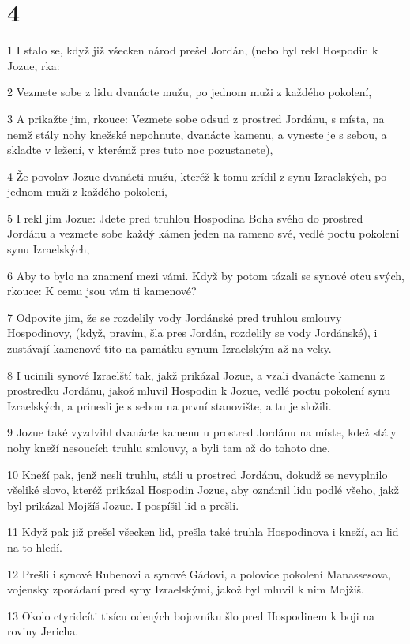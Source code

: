 \chapter{4}

\par 1 I stalo se, když již všecken národ prešel Jordán, (nebo byl rekl Hospodin k Jozue, rka:
\par 2 Vezmete sobe z lidu dvanácte mužu, po jednom muži z každého pokolení,
\par 3 A prikažte jim, rkouce: Vezmete sobe odsud z prostred Jordánu, s místa, na nemž stály nohy knežské nepohnute, dvanácte kamenu, a vyneste je s sebou, a skladte v ležení, v kterémž pres tuto noc pozustanete),
\par 4 Že povolav Jozue dvanácti mužu, kteréž k tomu zrídil z synu Izraelských, po jednom muži z každého pokolení,
\par 5 I rekl jim Jozue: Jdete pred truhlou Hospodina Boha svého do prostred Jordánu a vezmete sobe každý kámen jeden na rameno své, vedlé poctu pokolení synu Izraelských,
\par 6 Aby to bylo na znamení mezi vámi. Když by potom tázali se synové otcu svých, rkouce: K cemu jsou vám ti kamenové?
\par 7 Odpovíte jim, že se rozdelily vody Jordánské pred truhlou smlouvy Hospodinovy, (když, pravím, šla pres Jordán, rozdelily se vody Jordánské), i zustávají kamenové tito na památku synum Izraelským až na veky.
\par 8 I ucinili synové Izraelští tak, jakž prikázal Jozue, a vzali dvanácte kamenu z prostredku Jordánu, jakož mluvil Hospodin k Jozue, vedlé poctu pokolení synu Izraelských, a prinesli je s sebou na první stanovište, a tu je složili.
\par 9 Jozue také vyzdvihl dvanácte kamenu u prostred Jordánu na míste, kdež stály nohy kneží nesoucích truhlu smlouvy, a byli tam až do tohoto dne.
\par 10 Kneží pak, jenž nesli truhlu, stáli u prostred Jordánu, dokudž se nevyplnilo všeliké slovo, kteréž prikázal Hospodin Jozue, aby oznámil lidu podlé všeho, jakž byl prikázal Mojžíš Jozue. I pospíšil lid a prešli.
\par 11 Když pak již prešel všecken lid, prešla také truhla Hospodinova i kneží, an lid na to hledí.
\par 12 Prešli i synové Rubenovi a synové Gádovi, a polovice pokolení Manassesova, vojensky zporádaní pred syny Izraelskými, jakož byl mluvil k nim Mojžíš.
\par 13 Okolo ctyridcíti tisícu odených bojovníku šlo pred Hospodinem k boji na roviny Jericha.
